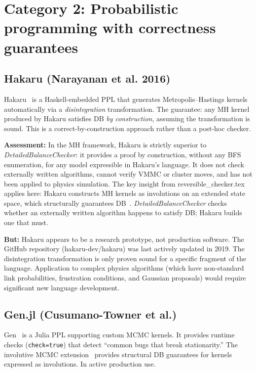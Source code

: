 \documentclass[11pt,a4paper]{article}
\newcommand{\DBC}{\textit{DetailedBalanceChecker}}
\begin{document}
\section{Category 2: Probabilistic programming with correctness guarantees}
\label{sec:ppl}

\subsection{Hakaru (Narayanan et al. 2016)}

Hakaru~\cite{Narayanan2016} is a Haskell-embedded PPL that generates
Metropolis--Hastings kernels automatically via a \emph{disintegration}
transformation.  The guarantee: any MH kernel produced by Hakaru satisfies DB
\emph{by construction}, assuming the transformation is sound.  This is a
correct-by-construction approach rather than a post-hoc checker.

\textbf{Assessment:}  In the MH framework, Hakaru is strictly superior to \DBC{}:
it provides a proof by construction, without any BFS enumeration, for any model
expressible in Hakaru's language.  It does not check externally written algorithms,
cannot verify VMMC or cluster moves, and has not been applied to physics simulation.
The key insight from reversible\_checker.tex applies here: Hakaru constructs MH
kernels as involutions on an extended state space, which structurally guarantees
DB~\cite{Neklyudov2020}.  \DBC{} checks whether an externally written algorithm
happens to satisfy DB; Hakaru builds one that must.

\textbf{But:}  Hakaru appears to be a research prototype, not production software.
The GitHub repository (hakaru-dev/hakaru) was last actively updated in 2019.
The disintegration transformation is only proven sound for a specific fragment of
the language.  Application to complex physics algorithms (which have non-standard
link probabilities, frustration conditions, and Gaussian proposals) would require
significant new language development.

\subsection{Gen.jl (Cusumano-Towner et al.)}

Gen~\cite{Gen} is a Julia PPL supporting custom MCMC kernels.  It provides runtime
checks (\texttt{check=true}) that detect ``common bugs that break stationarity.''
The involutive MCMC extension~\cite{Lew2020} provides structural DB guarantees for
kernels expressed as involutions.  In active production use.
\end{document}
